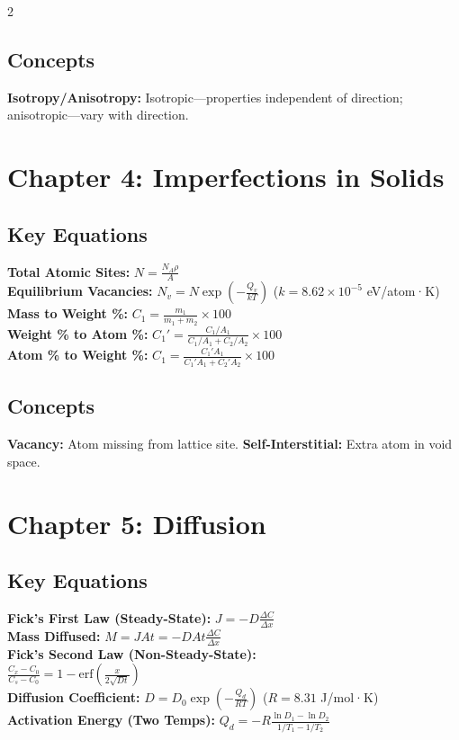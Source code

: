 \documentclass[8pt]{extarticle}
\begin{document}
\begin{multicols*}{2}
\subsection*{Concepts}
\textbf{Isotropy/Anisotropy:} Isotropic—properties independent of direction; anisotropic—vary with direction.

\section*{Chapter 4: Imperfections in Solids}
\subsection*{Key Equations}
\textbf{Total Atomic Sites:} $N = \frac{N_A \rho}{A}$ \\
\textbf{Equilibrium Vacancies:} $N_v = N\exp\!\left(-\frac{Q_v}{kT}\right)$ \quad ($k=8.62\times10^{-5}$ eV/atom·K) \\
\textbf{Mass to Weight \%:} $C_1 = \frac{m_1}{m_1+m_2}\times100$ \\
\textbf{Weight \% to Atom \%:} $C_1' = \frac{C_1/A_1}{C_1/A_1+C_2/A_2}\times100$ \\
\textbf{Atom \% to Weight \%:} $C_1 = \frac{C_1'A_1}{C_1'A_1+C_2'A_2}\times100$
\subsection*{Concepts}
\textbf{Vacancy:} Atom missing from lattice site. \textbf{Self-Interstitial:} Extra atom in void space.

\section*{Chapter 5: Diffusion}
\subsection*{Key Equations}
\textbf{Fick's First Law (Steady-State):} $J = -D\frac{\Delta C}{\Delta x}$ \\
\textbf{Mass Diffused:} $M = JAt = -DAt\frac{\Delta C}{\Delta x}$ \\
\textbf{Fick's Second Law (Non-Steady-State):} \\
$\frac{C_x - C_0}{C_s - C_0} = 1 - \mathrm{erf}\!\left(\frac{x}{2\sqrt{Dt}}\right)$ \\
\textbf{Diffusion Coefficient:} $D = D_0\exp\!\left(-\frac{Q_d}{RT}\right)$ \quad ($R=8.31$ J/mol·K) \\
\textbf{Activation Energy (Two Temps):} $Q_d = -R\frac{\ln D_1 - \ln D_2}{1/T_1 - 1/T_2}$


\end{multicols*}
\end{document}
